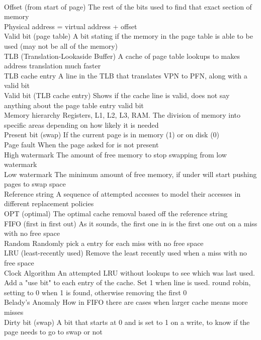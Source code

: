 \documentclass[6pt]{article}
\begin{document}
\\
Offset (from start of page)
The rest of the bits used to find that exact section of memory
\\
Physical address = virtual address + offset
\\
Valid bit (page table)
A bit stating if the memory in the page table is able to be used (may not be all of the memory)
\\
TLB (Translation-Lookaside Buffer)
A cache of page table lookups to makes address translation much faster
\\
TLB cache entry
A line in the TLB that translates VPN to PFN, along with a valid bit
\\
Valid bit (TLB cache entry)
Shows if the cache line is valid, does not say anything about the page table entry valid bit
\\
Memory hierarchy
Registers, L1, L2, L3, RAM. The division of memory into specific areas depending on how likely it is needed
\\
Present bit (swap)
If the current page is in memory (1) or on disk (0)
\\
Page fault
When the page asked for is not present
\\
High watermark
The amount of free memory to stop swapping from low watermark
\\
Low watermark
The minimum amount of free memory, if under will start pushing pages to swap space
\\
Reference string
A sequence of attempted accesses to model their accesses in different replacement policies
\\
OPT (optimal)
The optimal cache removal based off the reference string
\\
FIFO (first in first out)
As it sounds, the first one in is the first one out on a miss with no free space
\\
Random
Randomly pick a entry for each miss with no free space
\\
LRU (least-recently used)
Remove the least recently used when a miss with no free space
\\
Clock Algorithm
An attempted LRU without lookups to see which was last used. Add a "use bit" to each entry of the cache. Set 1 when line is used. round robin, setting to 0 when 1 is found, otherwise removing the first 0
\\
Belady’s Anomaly
How in FIFO there are cases when larger cache means more misses
\\
Dirty bit (swap)
A bit that starts at 0 and is set to 1 on a write, to know if the page needs to go to swap or not
\end{document}
